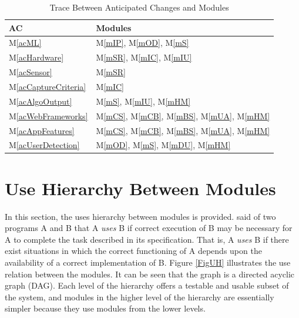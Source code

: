 \documentclass[12pt, titlepage]{article}
\newcommand{\mref}[1]{M\ref{#1}}
\begin{document}
\begin{table}[H]
\centering
\begin{tabular}{p{} p{}}
\toprule
\textbf{AC} & \textbf{Modules}\\
\midrule
\mref{acML} & \mref{mIP}, \mref{mOD}, \mref{mS} \\
\mref{acHardware} & \mref{mSR}, \mref{mIC}, \mref{mIU} \\
\mref{acSensor} & \mref{mSR} \\
\mref{acCaptureCriteria} & \mref{mIC} \\
\mref{acAlgoOutput} & \mref{mS}, \mref{mIU}, \mref{mHM} \\
\mref{acWebFrameworks} & \mref{mCS}, \mref{mCB}, \mref{mBS}, \mref{mUA}, \mref{mHM} \\
\mref{acAppFeatures} & \mref{mCS}, \mref{mCB}, \mref{mBS}, \mref{mUA}, \mref{mHM} \\
\mref{acUserDetection} & \mref{mOD}, \mref{mS}, \mref{mDU}, \mref{mHM} \\
\bottomrule
\end{tabular}
\caption{Trace Between Anticipated Changes and Modules}
\label{TblACT}
\end{table}

\section{Use Hierarchy Between Modules} \label{SecUse}

In this section, the uses hierarchy between modules is
provided. \citet{Parnas1978} said of two programs A and B that A {\em uses} B if
correct execution of B may be necessary for A to complete the task described in
its specification. That is, A {\em uses} B if there exist situations in which
the correct functioning of A depends upon the availability of a correct
implementation of B.  Figure \ref{FigUH} illustrates the use relation between
the modules. It can be seen that the graph is a directed acyclic graph
(DAG). Each level of the hierarchy offers a testable and usable subset of the
system, and modules in the higher level of the hierarchy are essentially simpler
because they use modules from the lower levels.

\end{document}
